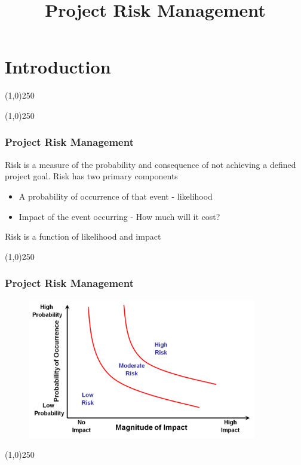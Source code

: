 



%
\title[Project Management \& BIM]{Project Risk Management}


%
\usetikzlibrary{arrows}



\newpage
\tableofcontents

\newpage

\thispagestyle{empty}
\tableofcontents
\newpage
\section{Introduction}



\begin{frame}
\titlepage
\end{frame}\begin{center}\line(1,0){250}\end{center}
%
%
\begin{center}\line(1,0){250}\end{center}

\begin{frame}
\frametitle{Project Risk Management}
Risk is a measure of the probability and consequence of not achieving a defined project goal.
Risk has two primary components
\begin{itemize}
	\item A probability of occurrence of that event - likelihood
	\item Impact of the event occurring - How much will it cost?
\end{itemize}
Risk is a function of likelihood and impact
\end{frame}


\begin{center}\line(1,0){250}\end{center}

\begin{frame}
\frametitle{Project Risk Management}
\begin{figure}[h]
	\centering
		\includegraphics[width=10cm]{images/MagImpact.png}
	\label{fig:MagImpact}
\end{figure}


\end{frame}\begin{center}\line(1,0){250}\end{center}




